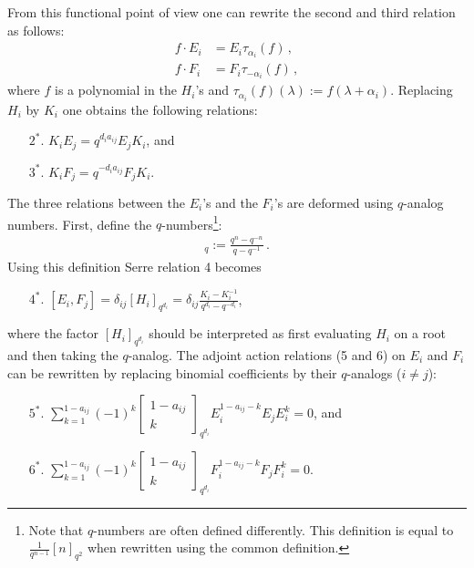 \begin{construct}
        From this functional point of view one can rewrite the second and third relation as follows:
        \begin{align*}
            f\cdot E_i &= E_i\tau_{\alpha_i}(f)\,,\\
            f\cdot F_i &= F_i\tau_{-\alpha_i}(f)\,,
        \end{align*}
        where $f$ is a polynomial in the $H_i$'s and $\tau_{\alpha_i}(f)(\lambda) := f(\lambda+\alpha_i)$. Replacing $H_i$ by $K_i$ one obtains the following relations:
        \begin{enumerate}
            \item[$2^*.$] $K_iE_j = q^{d_ia_{ij}}E_jK_i$, and
            \item[$3^*.$] $K_iF_j = q^{-d_ia_{ij}}F_jK_i$.
        \end{enumerate}
        The three relations between the $E_i$'s and the $F_i$'s are deformed using $q$-analog numbers. First, define the $q$-numbers\footnote{Note that $q$-numbers are often defined differently. This definition is equal to $\frac{1}{q^{n-1}}[n]_{q^2}$ when rewritten using the common definition.}:
        \begin{gather}
            [n]_q := \frac{q^n - q^{-n}}{q - q^{-1}}\,.
        \end{gather}
        Using this definition Serre relation 4 becomes
        \begin{enumerate}
            \item[$4^*.$] $[E_i,F_j] = \delta_{ij}[H_i]_{q^{d_i}} = \delta_{ij}\frac{K_i - K_i^{-1}}{q^{d_i} - q^{-d_i}}$,
        \end{enumerate}
        where the factor $[H_i]_{q^{d_i}}$ should be interpreted as first evaluating $H_i$ on a root and then taking the $q$-analog. The adjoint action relations (5 and 6) on $E_i$ and $F_i$ can be rewritten by replacing binomial coefficients by their $q$-analogs ($i\neq j$):
        \begin{enumerate}
            \item[$5^*.$] $\sum_{k=1}^{1-a_{ij}} (-1)^k\begin{bmatrix}1-a_{ij}\\k\end{bmatrix}_{q^{d_i}}E_i^{1-a_{ij}-k}E_jE_i^k = 0$, and
            \item[$6^*.$] $\sum_{k=1}^{1-a_{ij}} (-1)^k\begin{bmatrix}1-a_{ij}\\k\end{bmatrix}_{q^{d_i}}F_i^{1-a_{ij}-k}F_jF_i^k = 0$.
        \end{enumerate}
    \end{construct}

